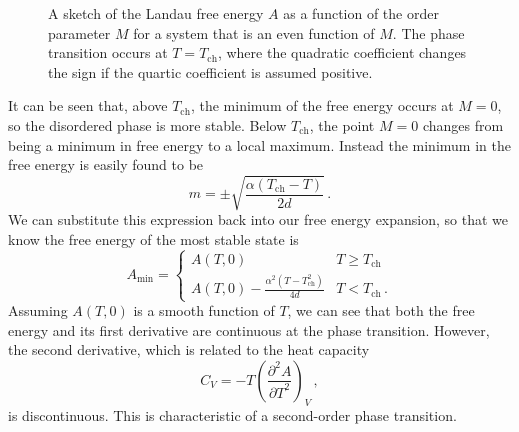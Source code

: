 \documentclass{article}
\theoremstyle{plain}\theoremheaderfont{\normalfont\bfseries}\theorembodyfont{\rmfamily}\theoremseparator{.}\newtheorem*{thm}{Theorem}\newtheorem*{law}{Law}\newtheorem*{pos}{Postulate}
\numberwithin{equation}{section}
\newcommand{\pdv}[3][]{\frac{\partial^{#1} #2}{{\partial #3}^{#1}}}
\begin{document}
    \begin{figure}
        \centering
        \caption{A sketch of the Landau free energy \(A\) as a function of the order parameter \(M\) for a system that is an even function of \(M\). The phase transition occurs at \(T=T_{\text{ch}}\), where the quadratic coefficient changes the sign if the quartic coefficient is assumed positive.}
        \label{second_order_Landau}
    \end{figure}

    It can be seen that, above \(T_{\text{ch}}\), the minimum of the free energy occurs at \(M=0\), so the disordered phase is more stable. Below \(T_{\text{ch}}\), the point \(M=0\) changes from being a minimum in free energy to a local maximum. Instead the minimum in the free energy is easily found to be
    \begin{equation}
        m=\pm\sqrt{\frac{\alpha(T_{\text{ch}}-T)}{2d}}\,.
    \end{equation}
    We can substitute this expression back into our free energy expansion, so that we know the free energy of the most stable state is
    \begin{equation}
        A_{\text{min}}=\begin{cases}
            A(T,0) & T\ge T_{\text{ch}} \\
            A(T,0)-\frac{\alpha^2(T-T_{\text{ch}}^2)}{4d} & T<T_{\text{ch}}\,.
        \end{cases}
    \end{equation}
    Assuming \(A(T,0)\) is a smooth function of \(T\), we can see that both the free energy and its first derivative are continuous at the phase transition. However, the second derivative, which is related to the heat capacity
    \begin{equation}
        C_V=-T\left(\pdv[2]{A}{T}\right)_{V}\,,
    \end{equation}
    is discontinuous. This is characteristic of a second-order phase transition.
\end{document}
